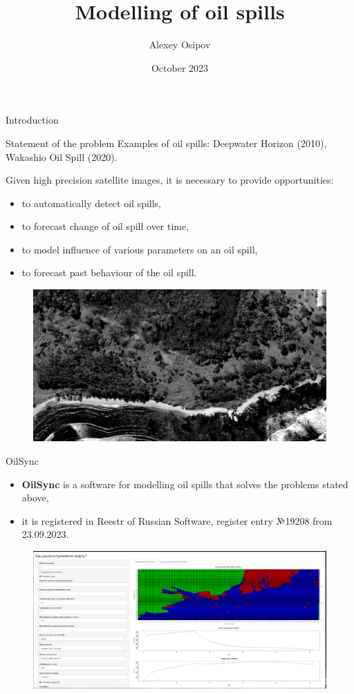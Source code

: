 \documentclass{beamer}
\title{Modelling of oil spills}
\author{
	Alexey Osipov\inst{1, 2}
}
\institute{
	\inst{1}
	Syncretis
	\inst{2}
	Tinkoff
}
\date{October 2023}
\begin{document}
\begin{frame}
\titlepage
\end{frame}	
\begin{section}{Introduction}
\begin{frame}{Statement of the problem}
Examples of oil spills: Deepwater Horizon (2010), Wakashio Oil Spill (2020).	
	
Given high precision satellite images, it is necessary to provide opportunities:
\begin{itemize}
	\item to automatically detect oil spills,
	\item to forecast change of oil spill over time,
	\item to model influence of various parameters on an oil spill,
	\item to forecast past behaviour of the oil spill.
\end{itemize}

\begin{figure}[H]
	\centering
	\includegraphics[scale=0.1]{maxar_8thAugust_1_21_45.png}
\end{figure}
\end{frame}
\begin{frame}{OilSync}
\begin{itemize}
	\item \textbf{OilSync} is a software for modelling oil spills that solves the problems stated above,
	\item it is registered in Reestr of Russian Software, register entry №19208 from 23.09.2023.
\end{itemize}

\begin{figure}[H]
	\centering
	\includegraphics[scale=0.2]{how_oil_spreads.png}
\end{figure}
\end{frame}


\end{section}
\end{document}

